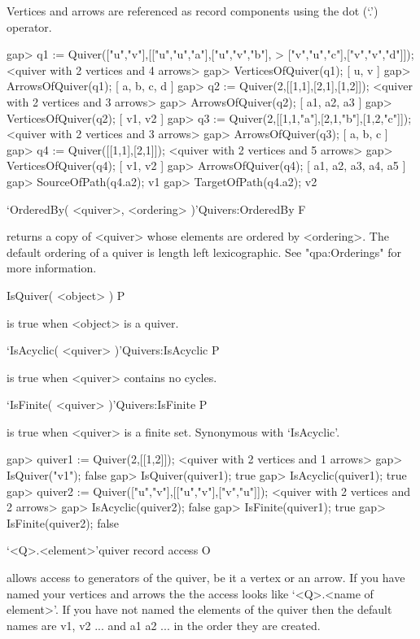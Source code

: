 Vertices and arrows are referenced as record components
using the dot (`.') operator.

\beginexample 
gap> q1 := Quiver(["u","v"],[["u","u","a"],["u","v","b"],
> ["v","u","c"],["v","v","d"]]);
<quiver with 2 vertices and 4 arrows>
gap> VerticesOfQuiver(q1);
[ u, v ]
gap> ArrowsOfQuiver(q1);
[ a, b, c, d ]
gap> q2 := Quiver(2,[[1,1],[2,1],[1,2]]);
<quiver with 2 vertices and 3 arrows>
gap> ArrowsOfQuiver(q2);
[ a1, a2, a3 ]
gap> VerticesOfQuiver(q2);
[ v1, v2 ]
gap> q3 := Quiver(2,[[1,1,"a"],[2,1,"b"],[1,2,"c"]]);
<quiver with 2 vertices and 3 arrows>
gap> ArrowsOfQuiver(q3);
[ a, b, c ]
gap> q4 := Quiver([[1,1],[2,1]]);
<quiver with 2 vertices and 5 arrows>
gap> VerticesOfQuiver(q4);
[ v1, v2 ]
gap> ArrowsOfQuiver(q4);
[ a1, a2, a3, a4, a5 ]
gap> SourceOfPath(q4.a2);
v1
gap> TargetOfPath(q4.a2);
v2
\endexample

\>`OrderedBy( <quiver>, <ordering> )'{Quivers:OrderedBy} F

returns a copy of <quiver> whose elements are ordered
by <ordering>. The default ordering of a quiver
is length left lexicographic.
See "qpa:Orderings" for more information.



\>IsQuiver( <object> ) P

is true when <object> is a quiver.

\>`IsAcyclic( <quiver> )'{Quivers:IsAcyclic} P

is true when <quiver> contains no cycles.

\>`IsFinite( <quiver> )'{Quivers:IsFinite} P

is true when <quiver> is a finite set.
Synonymous with `IsAcyclic'.

\beginexample
gap> quiver1 := Quiver(2,[[1,2]]);
<quiver with 2 vertices and 1 arrows>
gap> IsQuiver("v1");
false
gap> IsQuiver(quiver1);
true
gap> IsAcyclic(quiver1);
true
gap> quiver2 := Quiver(["u","v"],[["u","v"],["v","u"]]);
<quiver with 2 vertices and 2 arrows>
gap> IsAcyclic(quiver2);
false
gap> IsFinite(quiver1);
true
gap> IsFinite(quiver2);
false
\endexample


\>`<Q>.<element>'{quiver record access} O

allows access to generators of the quiver, be it a vertex or an arrow.  If you have named your vertices
and arrows the the access looks like `<Q>.<name of element>'.  If you have not named the elements of the 
quiver then the default names are v1, v2 ... and a1 a2 ... in the order they are created.

